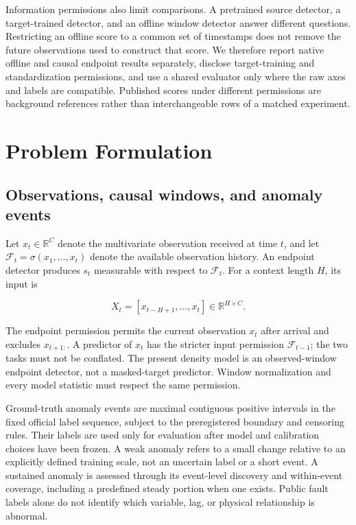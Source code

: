 \documentclass[
  english,
]{article}
\begin{document}
Information permissions also limit comparisons. A pretrained source
detector, a target-trained detector, and an offline window detector
answer different questions. Restricting an offline score to a common set
of timestamps does not remove the future observations used to construct
that score. We therefore report native offline and causal endpoint
results separately, disclose target-training and standardization
permissions, and use a shared evaluator only where the raw axes and
labels are compatible. Published scores under different permissions are
background references rather than interchangeable rows of a matched
experiment.

\section{Problem Formulation}\label{problem-formulation}

\subsection{Observations, causal windows, and anomaly
events}\label{observations-causal-windows-and-anomaly-events}

Let \(x_t\in\mathbb R^C\) denote the multivariate observation received
at time \(t\), and let \(\mathcal F_t=\sigma(x_1,\ldots,x_t)\) denote
the available observation history. An endpoint detector produces \(s_t\)
measurable with respect to \(\mathcal F_t\). For a context length \(H\),
its input is

\[X_t=[x_{t-H+1},\ldots,x_t]\in\mathbb R^{H\times C}.\]

The endpoint permission permits the current observation \(x_t\) after
arrival and excludes \(x_{t+1:}\). A predictor of \(x_t\) has the
stricter input permission \(\mathcal F_{t-1}\); the two tasks must not
be conflated. The present density model is an observed-window endpoint
detector, not a masked-target predictor. Window normalization and every
model statistic must respect the same permission.

Ground-truth anomaly events are maximal contiguous positive intervals in
the fixed official label sequence, subject to the preregistered boundary
and censoring rules. Their labels are used only for evaluation after
model and calibration choices have been frozen. A weak anomaly refers to
a small change relative to an explicitly defined training scale, not an
uncertain label or a short event. A sustained anomaly is assessed
through its event-level discovery and within-event coverage, including a
predefined steady portion when one exists. Public fault labels alone do
not identify which variable, lag, or physical relationship is abnormal.
\end{document}
